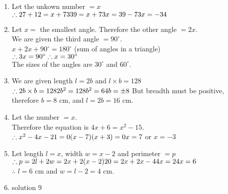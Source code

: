 \begin{solutions}{}
{\begin{enumerate}[itemsep=10pt, label=\textbf{\arabic*}. ]
\item Let the unkown number $=x$\\
$\therefore 27+12=x+73\\
39=x+73\\
x=39-73\\
x=-34\\$

\item Let $x=$ the smallest angle. Therefore the other angle $=2x$. \\
We are given the third angle $=90^{\circ}$. \\
$x+2x+90^{\circ} = 180^{\circ}$ (sum of angles in a triangle)\\
$\therefore 3x = 90^{\circ}\\
\therefore x= 30^{\circ}$\\
The sizes of the angles are $30^{\circ}$ and $60^{\circ}$. 
\item 
We are given length $l=2b$ and $l\times b=128$\\
$\therefore 2b\times b =128\\
2b^2=128\\
b^2=64\\
b=\pm8\\$
But breadth must be positive, therefore $b=8$ cm, and $l=2b=16$ cm.
\item Let the number $=x$. \\
Therefore the equation is $4x+6=x^2-15$.\\
$\therefore x^2-4x-21=0\\
(x-7)(x+3)=0\\
x=7$ or $x=-3$
\item Let length $l=x$, width $w=x-2$ and perimeter $=p$\\
$\therefore p = 2l+2w\\
=2x+2(x-2)\\
20=2x+2x-4\\
4x=24\\
x=6$\\
$\therefore$ $l=6$ cm and $w=l-2=4$ cm.
\item solution 9

\end{enumerate}}
\end{solutions}



